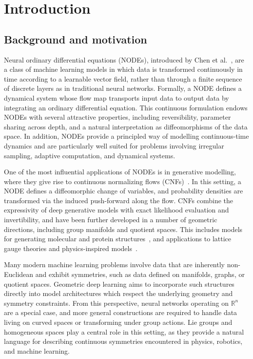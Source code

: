 \documentclass[12pt,a4paper]{article}
\numberwithin{equation}{section}
\theoremstyle{plain}
\theoremstyle{definition}
\theoremstyle{remark}
\begin{document}
\newpage
\tableofcontents


\section{Introduction}\label{sec:introduction}
\subsection{Background and motivation}
\label{sec:intro_background}
Neural ordinary differential equations (NODEs), introduced by Chen et al.~\cite{Chen2018}, are a class of machine learning models in which data is transformed continuously in time according to a learnable vector field, rather than through a finite sequence of discrete layers as in traditional neural networks. Formally, a NODE defines a dynamical system whose flow map transports input data to output data by integrating an ordinary differential equation. This continuous formulation endows NODEs with several attractive properties, including reversibility, parameter sharing across depth, and a natural interpretation as diffeomorphisms of the data space. In addition, NODEs provide a principled way of modelling continuous-time dynamics and are particularly well suited for problems involving irregular sampling, adaptive computation, and dynamical systems.

One of the most influential applications of NODEs is in generative modelling, where they give rise to continuous normalizing flows (CNFs)~\cite{Chen2018}. In this setting, a NODE defines a diffeomorphic change of variables, and probability densities are transformed via the induced push-forward along the flow. CNFs combine the expressivity of deep generative models with exact likelihood evaluation and invertibility, and have been further developed in a number of geometric directions, including group manifolds and quotient spaces. This includes models for generating molecular and protein structures~\cite{Yim2023,Bose2024,Li2024,Geffner2025,Dunn2026}, and applications to lattice gauge theories and physics-inspired models~\cite{Gerdes2024,huang2025learning}.

Many modern machine learning problems involve data that are inherently non-Euclidean and exhibit symmetries, such as data defined on manifolds, graphs, or quotient spaces.  Geometric deep learning aims to incorporate such structures directly into model architectures which respect the underlying geometry and symmetry constraints. From this perspective, neural networks operating on $\mathbb{R}^n$ are a special case, and more general constructions are required to handle data living on curved spaces or transforming under group actions. Lie groups and homogeneous spaces play a central role in this setting, as they provide a natural language for describing continuous symmetries encountered in physics, robotics, and machine learning.
\end{document}
